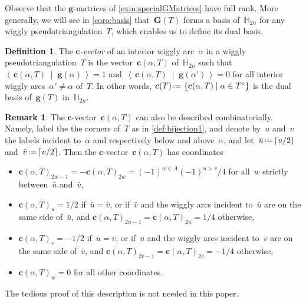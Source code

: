 \documentclass{amsart}
\theoremstyle{definition}
\newtheorem{definition}[theorem]{Definition}
\newtheorem{remark}[theorem]{Remark}
\newcommand{\HH}{\mathbb{H}} %
\renewcommand{\b}[1]{{\boldsymbol{#1}}} %
\newcommand{\set}[2]{\left\{ #1 \;\middle|\; #2 \right\}} %
\newcommand{\dotprod}[2]{\left\langle \, #1 \; \middle| \; #2 \, \right\rangle} %
\newcommand{\eqdef}{\mbox{\,\raisebox{0.2ex}{\scriptsize\ensuremath{\mathrm:}}\ensuremath{=}\,}} %
\newcommand{\darkblue}{\color{darkblue}} %
\newcommand{\defn}[1]{\textsl{\darkblue #1}} %
\begin{document}
Observe that the $\b{g}$-matrices of \cref{exm:specialGMatrices} have full rank.
More generally, we will see in \cref{coro:basis} that~$\b{G}(T)$ forms a basis of~$\HH_{2n}$ for any wiggly pseudotriangulation~$T$, which enables us to define its dual basis.

\begin{definition}
\label{def:cvectors}
The \defn{$\b{c}$-vector} of an interior wiggly arc~$\alpha$ in a wiggly pseudotriangulation~$T$ is the vector~$\b{c}(\alpha, T)$ of~$\HH_{2n}$ such that~$\dotprod{\b{c}(\alpha, T)}{\b{g}(\alpha)} = 1$ and~$\dotprod{\b{c}(\alpha, T)}{\b{g}(\alpha')} = 0$ for all interior wiggly arcs~$\alpha' \ne \alpha$ of~$T$.
In other words, $\b{c}(T) \eqdef \set{\b{c}(\alpha, T)}{\alpha \in T^\circ}$ is the dual basis of~$\b{g}(T)$ in~$\HH_{2n}$.
\end{definition}

\begin{remark}
The $\b{c}$-vector~$\b{c}(\alpha, T)$ can also be described combinatorially.
Namely, label the the corners of~$T$ as in \cref{def:bijection1}, and denote by~$u$ and~$v$ the labels incident to~$\alpha$ and respectively below and above~$\alpha$, and let~$\bar u \eqdef \lceil u/2 \rceil$ and~$\bar v \eqdef \lceil v/2 \rceil$.
Then the $\b{c}$-vector~$\b{c}(\alpha, T)$ has coordinates
\begin{itemize}
\item $\b{c}(\alpha, T)_{2w-1} = - \b{c}(\alpha, T)_{2w} = (-1)^{w \in A} (-1)^{u>v}/4$ for all~$w$ strictly between~$\bar u$ and~$\bar v$,
\item $\b{c}(\alpha, T)_u = 1/2$ if~$\bar u = \bar v$, or if~$\bar v$ and the wiggly arcs incident to~$\bar u$ are on the same side of~$\bar u$, and $\b{c}(\alpha, T)_{2\bar u-1} = \b{c}(\alpha, T)_{2\bar u} = 1/4$ otherwise,
\item $\b{c}(\alpha, T)_v = -1/2$ if~$\bar u = \bar v$, or if~$\bar u$ and the wiggly arcs incident to~$\bar v$ are on the same side of~$\bar v$, and $\b{c}(\alpha, T)_{2\bar v-1} = \b{c}(\alpha, T)_{2\bar v} = -1/4$ otherwise,
\item $\b{c}(\alpha, T)_w = 0$ for all other coordinates.
\end{itemize}
The tedious proof of this description is not needed in this paper.
\end{remark}
\end{document}
